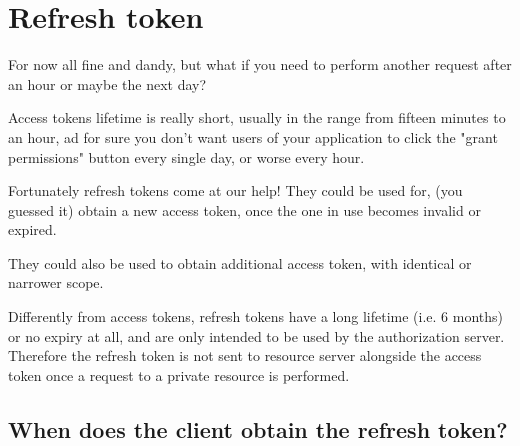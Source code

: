 \section{Refresh token}
\label{sec:refresh-token}
For now all fine and dandy, but what if you need to perform
another request after an hour or maybe the next day?

Access tokens lifetime is really short, usually in the range from fifteen
minutes to an hour, ad for sure you don't want users of your application
to click the "grant permissions" button every single day, or worse every hour.

Fortunately refresh tokens come at our help!
They could be used for, (you guessed it) obtain a new access token, once the one
in use becomes invalid or expired.

They could also be used to obtain additional access token, with identical or
narrower scope.

Differently from access tokens, refresh tokens have a long lifetime (i.e. 6
months) or no expiry at all, and
are only intended to be used by the authorization
server.
\\
Therefore the refresh token is not sent to resource server alongside the access token
once a request to a private resource is performed.

\subsection{When does the client obtain the refresh token?}

